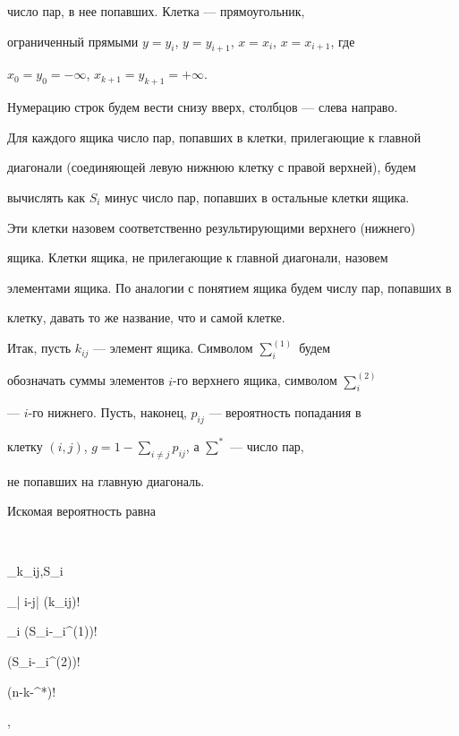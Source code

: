 число пар, в нее попавших. Клетка --- прямоугольник,


ограниченный прямыми $y=y_i$, $y=y_{i+1}$, $x=x_i$, $x=x_{i+1}$, где


$x_0=y_0=-\infty$, $x_{k+1}=y_{k+1}=+\infty$.


Нумерацию строк будем вести снизу вверх, столбцов --- слева направо.





Для каждого ящика число пар, попавших в клетки, прилегающие к главной


диагонали (соединяющей левую нижнюю клетку с правой верхней), будем


вычислять как $S_i$ минус число пар, попавших в остальные клетки ящика.


Эти клетки назовем соответственно результирующими верхнего (нижнего)


ящика. Клетки ящика, не прилегающие к главной диагонали, назовем


элементами ящика. По аналогии с понятием ящика будем числу пар, попавших в


клетку, давать то же название, что и самой клетке.





Итак, пусть $k_{ij}$ --- элемент ящика. Символом $\sum_i^{(1)}$ будем


обозначать суммы элементов $i$-го верхнего ящика, символом $\sum_i^{(2)}$


--- $i$-го нижнего. Пусть, наконец, $p_{ij}$ --- вероятность попадания в


клетку $(i,j)$, $g=1-\sum\limits_{i\neq j}p_{ij}$, а $\sum^*$ --- число пар,


не попавших на главную диагональ.


Искомая вероятность равна


$$


\sum_{k_{ij},S_i}




{


\prod\limits_{| i-j| }(k_{ij})! \,


\prod\limits_i \Big(S_i-\sum_i^{(1)}\Big)!\,


\Big(S_i-\sum_i^{(2)}\Big)!\,


\Big(n-k-\sum^*\Big)!},


